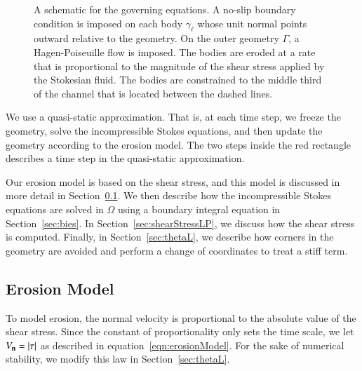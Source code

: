 \documentclass[preprint, 10pt]{elsarticle}
\begin{document}
\begin{figure}[htpb]
  \centering
  
  \caption{\label{fig:schematic} A schematic for the governing
    equations.  A no-slip boundary condition is imposed on each body
    $\gamma_\ell$ whose unit normal points outward relative to the
    geometry.  On the outer geometry $\Gamma$, a Hagen-Poiseuille flow
    is imposed.  The bodies are eroded at a rate that is proportional to
    the magnitude of the shear stress applied by the Stokesian fluid.
    The bodies are constrained to the middle third of the channel that
    is located between the dashed lines.}
\end{figure}

We use a quasi-static approximation.  That is, at each time step, we
freeze the geometry, solve the incompressible Stokes equations, and then
update the geometry according to the erosion model.  The two steps
inside the red rectangle describes a time step in the quasi-static
approximation.

%  

Our erosion model is based on the shear stress, and this model is
discussed in more detail in Section~\ref{sec:erosion}.  We then describe
how the incompressible Stokes equations are solved in $\Omega$ using a
boundary integral equation in Section~\ref{sec:bies}.  In
Section~\ref{sec:shearStressLP}, we discuss how the shear stress is
computed.  Finally, in Section~\ref{sec:thetaL}, we describe how corners
in the geometry are avoided and perform a change of coordinates to treat a stiff term.


\subsection{Erosion Model} 
\label{sec:erosion}

To model erosion, the normal velocity is  proportional to the absolute
value of the shear stress.   Since the constant of proportionality only
sets the time scale, we let $V_{\mathbf{n}} = |\tau|$ as described in
equation~\eqref{eqn:erosionModel}. For the sake of numerical stability,
we modify this law in Section~\ref{sec:thetaL}.
\end{document}
